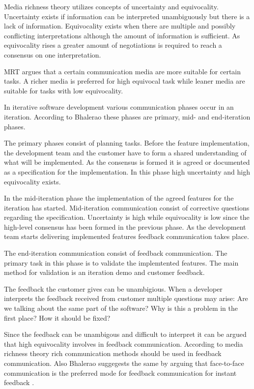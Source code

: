 \documentclass[conference]{IEEEtran}
\begin{document}
Media richness theory utilizes concepts of uncertainty and equivocality. Uncertainty exists if information can be interpreted unambiguously but there is a lack of information. Equivocality exists when there are multiple and possibly conflicting interpretations although the amount of information is sufficient. As equivocality rises a greater amount of negotiations is required to reach a consensus on one interpretation. \cite{1999dennis}

MRT argues that a certain communication media are more suitable for certain tasks. A richer media is preferred for high equivocal task while leaner media are suitable for tasks with low equivocality. \cite{1999dennis}

In iterative software development various communication phases occur in an iteration. According to Bhalerao these phases are primary, mid- and end-iteration phases. \cite{2010bhalerao}

The primary phases consist of planning tasks. Before the feature implementation, the development team and the customer have to form a shared understanding of what will be implemented. As the consensus is formed it is agreed or documented as a specification for the implementation. In this phase high uncertainty and high equivocality exists. 

In the mid-iteration phase the implementation of the agreed features for the iteration has started. Mid-iteration communication consist of corrective questions regarding the specification. Uncertainty is high while equivocality is low since the high-level consensus has been formed in the previous phase. As the development team starts delivering implemented features feedback communication takes place.

The end-iteration communication consist of feedback communication. The primary task in this phase is to validate the implemtented features. The main method for validation is an iteration demo and customer feedback.

The feedback the customer gives can be unambigious. When a developer interprets the feedback received from customer multiple questions may arise: Are we talking about the same part of the software? Why is this a problem in the first place? How it should be fixed?

Since the feedback can be unambigous and difficult to interpret it can be argued that high equivocality involves in feedback communication. According to media richness theory rich communication methods should be used in feedback communication. Also Bhalerao suggegests the same by arguing that face-to-face communication is the preferred mode for feedback communication for instant feedback \cite{2010bhalerao}. 
\end{document}
